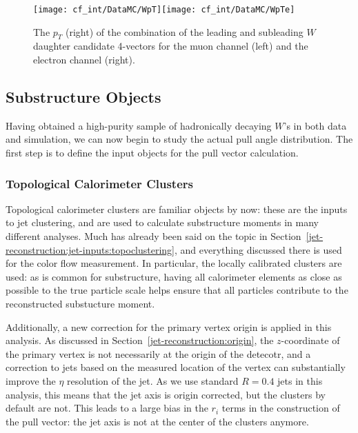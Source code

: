 \begin{figure}[h!]
\begin{center}
\texttt{[image: cf\_int/DataMC/WpT]}\texttt{[image: cf\_int/DataMC/WpTe]}
 \caption{The $p_T$ (right) of the combination of the leading and subleading $W$ daughter candidate 4-vectors for the muon channel (left) and the electron channel (right). }
 \label{fig:color:yields:wpt}
  \end{center}
\end{figure}



\FloatBarrier



	\subsection{Substructure Objects}

Having obtained a high-purity sample of hadronically decaying $W$'s in both data and simulation, we can now begin to study the actual pull angle distribution. The first step is to define the input objects for the pull vector calculation.

	\subsubsection{Topological Calorimeter Clusters}

Topological calorimeter clusters are familiar objects by now: these are the inputs to jet clustering, and are used to calculate substructure moments in many different analyses. Much has already been said on the topic in Section~\ref{jet-reconstruction:jet-inputs:topoclustering}, and everything discussed there is used for the color flow measurement. In particular, the locally calibrated clusters are used: as is common for substructure, having all calorimeter elements as close as possible to the true particle scale helps ensure that all particles contribute to the reconstructed substucture moment. 

Additionally, a new correction for the primary vertex origin is applied in this analysis. As discussed in Section~\ref{jet-reconstruction:origin}, the $z$-coordinate of the primary vertex is not necessarily at the origin of the detecotr, and a correction to jets based on the measured location of the vertex can substantially improve the $\eta$ resolution of the jet. As we use standard \akt $R=0.4$ jets in this analysis, this means that the jet axis is origin corrected, but the clusters by default are not.  This leads to a large bias in the $r_i$ terms in the construction of the pull vector: the jet axis is not at the center of the clusters anymore.

